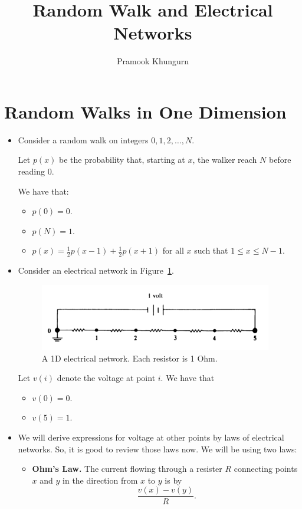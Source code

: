 \documentclass[10pt]{article}
\title{Random Walk and Electrical Networks}
\author{Pramook Khungurn}
\begin{document}
	\maketitle
	
\section{Random Walks in One Dimension}

\begin{itemize}
	\item Consider a random walk on integers $0, 1, 2, \dotsc, N$.
		
		Let $p(x)$ be the probability that, starting at $x$,
		the walker reach $N$ before reading $0$.
		
		We have that:
		\begin{itemize}
			\item $p(0) = 0.$
			\item $p(N) = 1.$
			\item $p(x) = \frac{1}{2} p(x-1) + \frac{1}{2} p(x+1)$
				for all $x$ such that $1 \leq x \leq N-1.$
		\end{itemize}
		
	\item Consider an electrical network in Figure~\ref{1d-network}.
	
	\begin{figure}[h]
		\centering
		\includegraphics[width=4in]{1d-network.png}
		\caption{A 1D electrical network. Each resistor is 1 Ohm.}
		\label{1d-network}		
	\end{figure}
	
	Let $v(i)$ denote the voltage at point $i$. We have that
	\begin{itemize}
		\item $v(0) = 0$.
		\item $v(5) = 1$.
	\end{itemize}
	
	\item We will derive expressions for voltage at other points
		by laws of electrical networks. So, it is good to review
		those laws now. We will be using two laws:
		
		\begin{itemize}
			\item {\bf Ohm's Law.} The current flowing through
			a resister $R$ connecting points $x$ and $y$ in
			the direction from $x$ to $y$ is
			by $$\frac{v(x) - v(y)}{R}.$$
			

\end{itemize}
\end{itemize}
\end{document}
